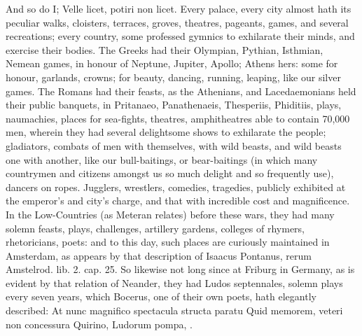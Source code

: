 {And so do I; Velle licet, potiri non licet.
Every palace, every city almost hath its peculiar walks, cloisters,
terraces, groves, theatres, pageants, games, and several recreations;
every country, some professed gymnics to exhilarate their minds, and
exercise their bodies. The Greeks had their Olympian, Pythian,
Isthmian, Nemean games, in honour of Neptune, Jupiter, Apollo; Athens
hers: some for honour, garlands, crowns; for beauty, dancing,
running, leaping, like our silver games. The Romans had their
feasts, as the Athenians, and Lacedaemonians held their public
banquets, in Pritanaeo, Panathenaeis, Thesperiis, Phiditiis, plays,
naumachies, places for sea-fights, theatres, amphitheatres able
to contain 70,000 men, wherein they had several delightsome shows to
exhilarate the people;  gladiators, combats of men with
themselves, with wild beasts, and wild beasts one with another, like
our bull-baitings, or bear-baitings (in which many countrymen and
citizens amongst us so much delight and so frequently use), dancers on
ropes. Jugglers, wrestlers, comedies, tragedies, publicly exhibited at
the emperor's and city's charge, and that with incredible cost and
magnificence. In the Low-Countries (as Meteran relates) before
these wars, they had many solemn feasts, plays, challenges, artillery
gardens, colleges of rhymers, rhetoricians, poets: and to this day,
such places are curiously maintained in Amsterdam, as appears by that
description of Isaacus Pontanus, rerum Amstelrod. lib. 2. cap. 25. So
likewise not long since at Friburg in Germany, as is evident by that
relation of Neander, they had Ludos septennales, solemn plays
every seven years, which Bocerus, one of their own poets, hath
elegantly described:
At nunc magnifico spectacula structa paratu
Quid memorem, veteri non concessura Quirino,
Ludorum pompa, \etc{}.

}
